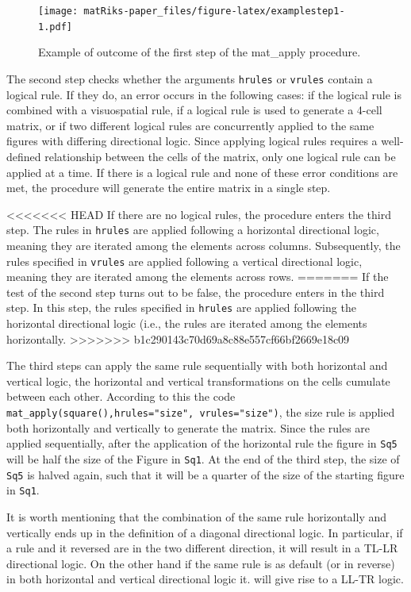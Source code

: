 \begin{figure}
\centering
\texttt{[image: matRiks-paper\_files/figure-latex/examplestep1-1.pdf]}
\caption{\label{fig:examplestep1}Example of outcome of the first step of the mat\_apply procedure.}
\end{figure}

The second step checks whether the arguments \texttt{hrules} or \texttt{vrules} contain a logical rule. If they do, an error occurs in the following cases: if the logical rule is combined with a visuospatial rule, if a logical rule is used to generate a 4-cell matrix, or if two different logical rules are concurrently applied to the same figures with differing directional logic. Since applying logical rules requires a well-defined relationship between the cells of the matrix, only one logical rule can be applied at a time. If there is a logical rule and none of these error conditions are met, the procedure will generate the entire matrix in a single step.

<<<<<<< HEAD
If there are no logical rules, the procedure enters the third step. The rules in \texttt{hrules} are applied following a horizontal directional logic, meaning they are iterated among the elements across columns. Subsequently, the rules specified in \texttt{vrules} are applied following a vertical directional logic, meaning they are iterated among the elements across rows.
=======
If the test of the second step turns out to be false, the procedure enters in the third step.
In this step, the rules specified in \texttt{hrules} are applied following the horizontal directional logic (i.e., the rules are iterated among the elements horizontally.
>>>>>>> b1c290143c70d69a8c88e557cf66bf2669e18c09

The third steps can apply the same rule sequentially with both horizontal and vertical logic, the horizontal and vertical transformations on the cells cumulate between each other.
According to this the code \texttt{mat\_apply(square(),hrules="size",\ vrules="size")}, the size rule is applied both horizontally and vertically to generate the matrix. Since the rules are applied sequentially, after the application of the horizontal rule the figure in \texttt{Sq5} will be half the size of the Figure in \texttt{Sq1}. At the end of the third step, the size of \texttt{Sq5} is halved again, such that it will be a quarter of the size of the starting figure in \texttt{Sq1}.

It is worth mentioning that the combination of the same rule horizontally and vertically ends up in the definition of a diagonal directional logic.
In particular, if a rule and it reversed are in the two different direction, it will result in a TL-LR directional logic.
On the other hand if the same rule is as default (or in reverse) in both horizontal and vertical directional logic it.
will give rise to a LL-TR logic.

